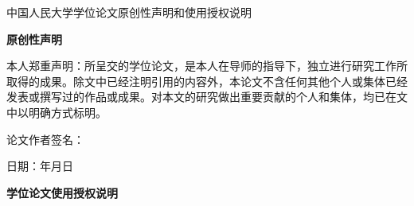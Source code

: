 \documentclass[12pt,UTF8]{ctexart}
\begin{document}
\begin{titlepage}
\begin{spacing}{1.3}
    \hspace{27mm}\heiti\LARGE{}
    

    \hspace{27mm}\heiti\LARGE{}
    
    \hspace{27mm}\heiti\LARGE{}
    
    \hspace{27mm}\heiti\LARGE{}
  \end{spacing}

  \vspace{25mm}

\end{titlepage}

\newpage
\thispagestyle{fancy}
\cfoot{}

\mbox{}
\vspace{14mm}

\begin{center}
    \heiti {} {中国人民大学学位论文原创性声明和使用授权说明}

\textbf{\songti {} 原创性声明}
\end{center}
\vspace{5mm}

本人郑重声明：所呈交的学位论文，是本人在导师的指导下，独立进行研究工作所取得的成果。除文中已经注明引用的内容外，本论文不含任何其他个人或集体已经发表或撰写过的作品或成果。对本文的研究做出重要贡献的个人和集体，均已在文中以明确方式标明。

\vspace{10mm}
\begin{spacing}{1.8}
\begin{flushright}
论文作者签名：\hspace{21mm}       

日期：\qquad 年\qquad 月\qquad 日
\end{flushright}
\end{spacing}

\vspace{34mm}

\begin{center}
\textbf{\songti {} 学位论文使用授权说明}
\end{center}
\vspace{5mm}
\end{document}
